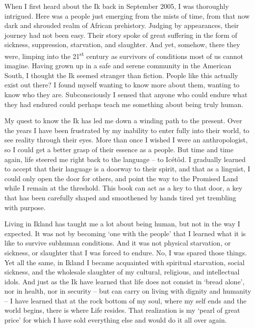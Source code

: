 When I first heard about the Ik back in September 2005, I was thoroughly intrigued. Here was a people just emerging from the mists of time, from that now dark and shrouded realm of African prehistory. Judging by appearances, their journey had not been easy. Their story spoke of great suffering in the form of sickness, suppression, starvation, and slaughter. And yet, somehow, there they were, limping into the 21\textsuperscript{st} century as survivors of conditions most of us cannot imagine. Having grown up in a safe and serene community in the American South, I thought the Ik seemed stranger than fiction. People like this actually exist out there? I found myself wanting to know more about them, wanting to know who they are. Subconsciously I sensed that anyone who could endure what they had endured could perhaps teach me something about being truly human. 

My quest to know the Ik has led me down a winding path to the present. Over the years I have been frustrated by my inability to enter fully into their world, to see reality through their eyes. More than once I wished I were an anthropologist, so I could get a better grasp of their essence as a people. But time and time again, life steered me right back to the language – to Icétôd. I gradually learned to accept that their language is a doorway to their spirit, and that as a linguist, I could only open the door for others, and point the way to the Promised Land while I remain at the threshold. This book can act as a key to that door, a key that has been carefully shaped and smoothened by hands tired yet trembling with purpose.

Living in Ikland has taught me a lot about being human, but not in the way I expected. It was not by becoming ‘one with the people’ that I learned what it is like to survive subhuman conditions. And it was not physical starvation, or sickness, or slaughter that I was forced to endure. No, I was spared those things. Yet all the same, in Ikland I became acquainted with spiritual starvation, social sickness, and the wholesale slaughter of my cultural, religious, and intellectual idols. And just as the Ik have learned that life does not consist in ‘bread alone’, nor in health, nor in security – but can carry on living with dignity and humanity – I have learned that at the rock bottom of my soul, where my self ends and the world begins, there is where Life resides. That realization is my ‘pearl of great price’ for which I have sold everything else and would do it all over again. 
